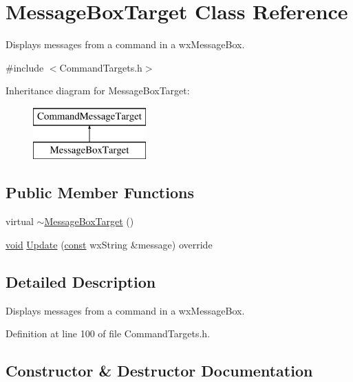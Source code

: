 \hypertarget{class_message_box_target}{}\section{Message\+Box\+Target Class Reference}
\label{class_message_box_target}


Displays messages from a command in a wx\+Message\+Box.  




{\ttfamily \#include $<$Command\+Targets.\+h$>$}

Inheritance diagram for Message\+Box\+Target\+:\begin{figure}[H]
\begin{center}
\leavevmode
\includegraphics[height=2.000000cm]{class_message_box_target}
\end{center}
\end{figure}
\subsection*{Public Member Functions}
\begin{DoxyCompactItemize}
\item 
virtual \hyperlink{class_message_box_target_a6a1fc52550624165c62cb84b2c376cad}{$\sim$\+Message\+Box\+Target} ()
\item 
\hyperlink{sound_8c_ae35f5844602719cf66324f4de2a658b3}{void} \hyperlink{class_message_box_target_a6d9cfee09cb02241825f6e8976c2bd87}{Update} (\hyperlink{getopt1_8c_a2c212835823e3c54a8ab6d95c652660e}{const} wx\+String \&message) override
\end{DoxyCompactItemize}


\subsection{Detailed Description}
Displays messages from a command in a wx\+Message\+Box. 

Definition at line 100 of file Command\+Targets.\+h.



\subsection{Constructor \& Destructor Documentation}
